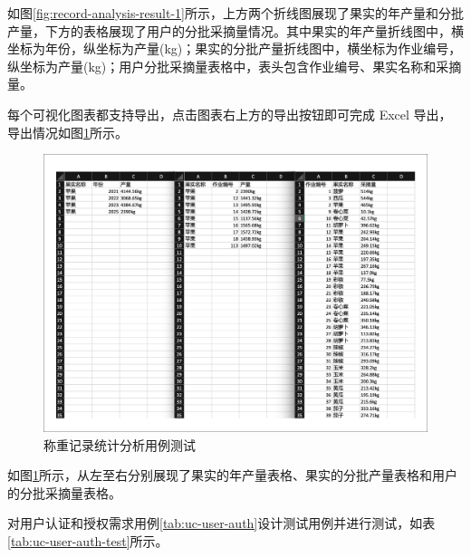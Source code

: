 如图\ref{fig:record-analysis-result-1}所示，上方两个折线图展现了果实的年产量和分批产量，下方的表格展现了用户的分批采摘量情况。其中果实的年产量折线图中，横坐标为年份，纵坐标为产量(kg)；果实的分批产量折线图中，横坐标为作业编号，纵坐标为产量(kg)；用户分批采摘量表格中，表头包含作业编号、果实名称和采摘量。

每个可视化图表都支持导出，点击图表右上方的导出按钮即可完成 Excel 导出，导出情况如图\ref{fig:record-analysis-result-2}所示。

\begin{figure}[H]
    \centering
    \includegraphics[width=0.9\linewidth]{../result/record-analysis-result-2.png}
    \caption{称重记录统计分析用例测试}
    \label{fig:record-analysis-result-2}
\end{figure}

如图\ref{fig:record-analysis-result-2}所示，从左至右分别展现了果实的年产量表格、果实的分批产量表格和用户的分批采摘量表格。

对用户认证和授权需求用例\ref{tab:uc-user-auth}设计测试用例并进行测试，如表\ref{tab:uc-user-auth-test}所示。

